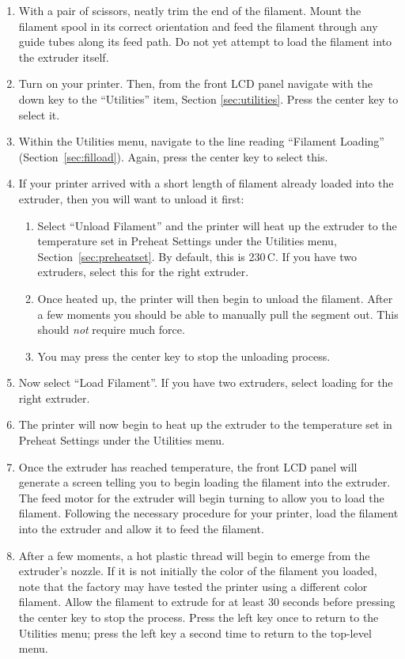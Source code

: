 \begin{enumerate}
\item With a pair of scissors, neatly trim the end of the filament.  Mount the filament spool in its correct orientation and feed the filament through any guide tubes along its feed path.  Do not yet attempt to load the filament into the extruder itself.
\item Turn on your printer.  Then, from the front LCD panel navigate with the down key to the ``Utilities'' item, Section \ref{sec:utilities}.  Press the center key to select it.
\item Within the Utilities menu, navigate to the line reading ``Filament Loading'' (Section~\ref{sec:filload}).  Again, press the center key to select this.
\item If your printer arrived with a short length of filament already loaded into the extruder, then you will want to unload it first:
\begin{enumerate}
\item Select ``Unload Filament'' and the printer will heat up the extruder to the temperature set in Preheat Settings under the Utilities menu, Section~\ref{sec:preheatset}.  By default, this is 230\textdegree\,C.  If you have two extruders, select this for the right extruder.
\item Once heated up, the printer will then begin to unload the filament.  After a few moments you should be able to manually pull the segment out.  This should \emph{not} require much force.
\item You may press the center key to stop the unloading process.
\end{enumerate}
\item Now select ``Load Filament''.  If you have two extruders, select loading
for the right extruder.
\item The printer will now begin to heat up the extruder to the temperature set in Preheat Settings under the Utilities menu.
\item Once the extruder has reached temperature, the front LCD panel will generate a screen telling you to begin loading the filament into the extruder.  The feed motor for the extruder will begin turning to allow you to load the filament.  Following the necessary procedure for your printer, load the filament into the extruder and allow it to feed the filament.
\item After a few moments, a hot plastic thread will begin to emerge from the extruder's nozzle.  If it is not initially the color of the filament you loaded, note that the factory may have tested the printer using a different color filament.  Allow the filament to extrude for at least 30 seconds before pressing the center key to stop the process.  Press the left key once to return to the Utilities menu; press the left key a second time to return to the top-level menu.
\end{enumerate}

